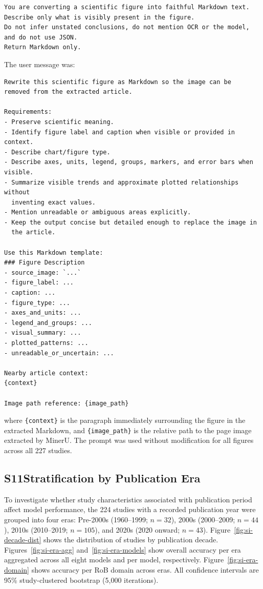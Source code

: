 \documentclass[../main.tex]{subfiles}
\begin{document}
\small
\begin{verbatim}
You are converting a scientific figure into faithful Markdown text.
Describe only what is visibly present in the figure.
Do not infer unstated conclusions, do not mention OCR or the model,
and do not use JSON.
Return Markdown only.
\end{verbatim}
\normalsize

The user message was:

\small
\begin{verbatim}
Rewrite this scientific figure as Markdown so the image can be
removed from the extracted article.

Requirements:
- Preserve scientific meaning.
- Identify figure label and caption when visible or provided in context.
- Describe chart/figure type.
- Describe axes, units, legend, groups, markers, and error bars when visible.
- Summarize visible trends and approximate plotted relationships without
  inventing exact values.
- Mention unreadable or ambiguous areas explicitly.
- Keep the output concise but detailed enough to replace the image in
  the article.

Use this Markdown template:
### Figure Description
- source_image: `...`
- figure_label: ...
- caption: ...
- figure_type: ...
- axes_and_units: ...
- legend_and_groups: ...
- visual_summary: ...
- plotted_patterns: ...
- unreadable_or_uncertain: ...

Nearby article context:
{context}

Image path reference: {image_path}
\end{verbatim}
\normalsize

where \texttt{\{context\}} is the paragraph immediately surrounding the figure
in the extracted Markdown, and \texttt{\{image\_path\}} is the relative path
to the page image extracted by MinerU.
The prompt was used without modification for all figures across all 227 studies.

\subsection*{S11\quad Stratification by Publication Era}
\label{sec:si-era}

To investigate whether study characteristics associated with publication period
affect model performance, the 224 studies with a recorded publication year were
grouped into four eras: Pre-2000s (1960--1999; $n = 32$), 2000s (2000--2009;
$n = 44$), 2010s (2010--2019; $n = 105$), and 2020s (2020 onward; $n = 43$).
Figure~\ref{fig:si-decade-dist} shows the distribution of studies by publication
decade.
Figures~\ref{fig:si-era-agg} and~\ref{fig:si-era-models} show overall accuracy
per era aggregated across all eight models and per model, respectively.
Figure~\ref{fig:si-era-domain} shows accuracy per RoB domain across eras.
All confidence intervals are 95\% study-clustered bootstrap (5{,}000 iterations).
\end{document}
